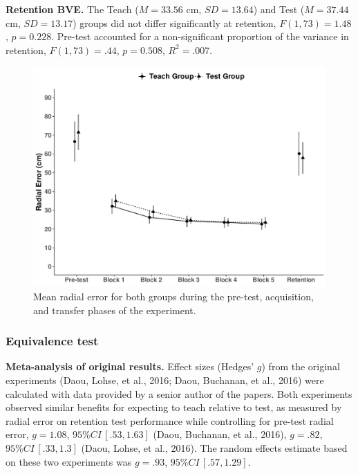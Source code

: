 \documentclass[
  english,
  man,floatsintext]{apa7}
\begin{document}
\textbf{Retention BVE.} The Teach (\(M = 33.56\) cm, \(SD = 13.64\)) and Test (\(M = 37.44\) cm, \(SD = 13.17\)) groups did not differ significantly at retention, \(F(1,73) = 1.48\), \(p = 0.228\). Pre-test accounted for a non-significant proportion of the variance in retention, \(F(1, 73) = .44\), \(p = 0.508\), \(R^{2} = .007\).

\begin{figure}

{\centering \includegraphics[width=1\linewidth,height=1\textheight]{../../figs/fig1} 

}

\caption{Mean radial error for both groups during the pre-test, acquisition, and transfer phases of the experiment.}\label{fig:fig1}
\end{figure}

\hypertarget{equivalence-test}{%
\subsubsection{Equivalence test}\label{equivalence-test}}

\textbf{Meta-analysis of original results.} Effect sizes (Hedges' \(g\)) from the original experiments (Daou, Lohse, et al., 2016; Daou, Buchanan, et al., 2016) were calculated with data provided by a senior author of the papers. Both experiments observed similar benefits for expecting to teach relative to test, as measured by radial error on retention test performance while controlling for pre-test radial error, \(g = 1.08\), \(95\%CI \,[.53, 1.63]\) (Daou, Buchanan, et al., 2016), \(g = .82\), \(95\%CI \,[.33, 1.3]\) (Daou, Lohse, et al., 2016). The random effects estimate based on these two experiments was \(g = .93\), \(95\%CI \,[.57, 1.29]\).
\end{document}
